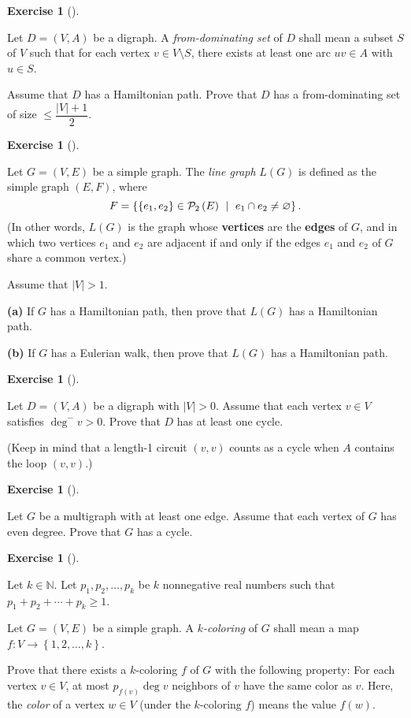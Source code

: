 \documentclass[numbers=enddot,12pt,final,onecolumn,notitlepage]{scrartcl}%
\newcounter{exer}
\theoremstyle{definition}
\newtheorem{exmp}[exer]{Exercise}
\newenvironment{exercise}[1][]
{\begin{exmp}[#1]\begin{leftbar}}
{\end{leftbar}\end{exmp}}
\newcommand{\NN}{\mathbb{N}}
\newcommand{\powset}[2][]{\ifthenelse{\equal{#2}{}}{\mathcal{P}\left(#1\right)}{\mathcal{P}_{#1}\left(#2\right)}}
\newcommand{\set}[1]{\left\{ #1 \right\}}
\newcommand{\abs}[1]{\left| #1 \right|}
\newcommand{\tup}[1]{\left( #1 \right)}
\begin{document}
\begin{exercise} \label{exe.mt1.from-dom}
Let $D = \tup{V, A}$ be a digraph. A \textit{from-dominating set} of
$D$ shall mean a subset $S$ of $V$ such that for each vertex $v \in
V \setminus S$, there exists at least one arc $uv \in A$ with
$u \in S$.

Assume that $D$ has a Hamiltonian path. Prove that $D$ has a
from-dominating set of size $\leq \dfrac{\abs{V}+1}{2}$.
\end{exercise}

\begin{exercise} \label{exe.mt1.L-hamil}
Let $G = \tup{V, E}$ be a simple graph. The \textit{line graph}
$L \tup{G}$ is defined as the simple graph $\tup{E, F}$, where
\[
F = \set{ \set{e_1, e_2} \in \powset[2]{E}
            \ \mid \ e_1 \cap e_2 \neq \varnothing } .
\]
(In other words, $L \tup{G}$ is the graph whose \textbf{vertices}
are the \textbf{edges} of $G$, and in which two vertices $e_1$ and
$e_2$ are adjacent if and only if the edges $e_1$ and $e_2$ of $G$
share a common vertex.)

Assume that $\abs{V} > 1$.

\textbf{(a)} If $G$ has a Hamiltonian path, then prove that
$L \tup{G}$ has a Hamiltonian path.

\textbf{(b)} If $G$ has a Eulerian walk, then prove that $L \tup{G}$
has a Hamiltonian path.
\end{exercise}

\begin{exercise} \label{exe.mt1.deg-cycle-dir}
Let $D = \tup{V, A}$ be a digraph with $\abs{V} > 0$. Assume
that each vertex $v \in V$ satisfies $\deg^- v > 0$. Prove that
$D$ has at least one cycle.

(Keep in mind that a length-1 circuit $\tup{v, v}$ counts as a cycle
when $A$ contains the loop $\tup{v, v}$.)
\end{exercise}

\begin{exercise} \label{exe.mt1.deg-cycle-2}
Let $G$ be a multigraph with at least one edge.
Assume that each vertex of $G$ has even degree.
Prove that $G$ has a cycle.
\end{exercise}

\begin{exercise} \label{exe.mt1.enmity}
Let $k \in \NN$. Let $p_1, p_2, \ldots, p_k$ be $k$ nonnegative
real numbers such that $p_1 + p_2 + \cdots + p_k \geq 1$.

Let $G = \tup{V, E}$ be a simple graph. A \textit{$k$-coloring} of $G$
shall mean a map $f : V \to \set{1, 2, \ldots, k}$.

Prove that there exists a
$k$-coloring $f$ of $G$ with the following property: For each vertex
$v \in V$, at most $p_{f\tup{v}} \deg v$ neighbors of $v$ have the
same color
as $v$. Here, the \textit{color} of a vertex $w \in V$ (under the
$k$-coloring $f$) means the value $f\tup{w}$.
\end{exercise}
\end{document}
